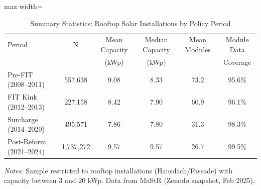 \begin{table}[t]
\centering
\caption{Summary Statistics: Rooftop Solar Installations by Policy Period}
\label{tab:summary}
\begin{adjustbox}{max width=\textwidth}
\begin{tabular}{lccccc}
\toprule
Period & N & Mean Capacity & Median Capacity & Mean Modules & Module Data \\
 & & (kWp) & (kWp) & & Coverage \\
\midrule
Pre-FIT (2008--2011) &   557,638 & 9.08 & 8.33 & 73.2 & 95.6\% \\
FIT Kink (2012--2013) &   227,158 & 8.42 & 7.90 & 60.9 & 96.1\% \\
Surcharge (2014--2020) &   495,571 & 7.86 & 7.80 & 31.3 & 98.3\% \\
Post-Reform (2021--2024) & 1,737,272 & 9.57 & 9.57 & 26.7 & 99.5\% \\
\bottomrule
\end{tabular}
\end{adjustbox}

\vspace{0.5em}
\begin{flushleft}\small \textit{Notes:} Sample restricted to rooftop installations (Hausdach/Fassade) with capacity between 3 and 20 kWp. Data from MaStR (Zenodo snapshot, Feb 2025).\end{flushleft}
\end{table}
